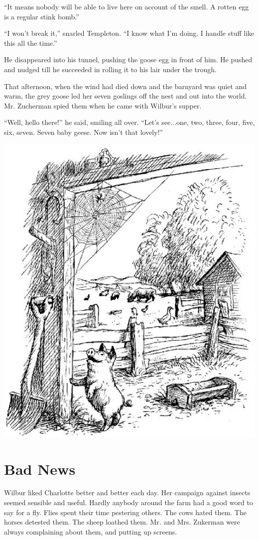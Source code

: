 \documentclass[a4paper, oneside]{book}
\begin{document}
 ``It means nobody will be able to live here on account of the smell.
A rotten egg is a regular stink bomb.''

 ``I won't break it,'' snarled Templeton. ``I know what I'm doing. I
handle stuff like this all the time.''

 He disappeared into his tunnel, pushing the goose egg in front of
him. He pushed and nudged till he succeeded in rolling it to his lair
under the trough.

 That afternoon, when the wind had died down and the barnyard
was quiet and warm, the grey goose led her seven goslings off the
nest and out into the world. Mr. Zucherman spied them when he
came with Wilbur's supper. 

 ``Well, hello there!'' he said, smiling all over. ``Let's see...one, two,
three, four, five, six, seven. Seven baby geese. Now isn't that
lovely!'' 

\vspace{0.1cm}

 \includegraphics[scale=0.5]{cover.eps}
 
  \chapter{Bad News}
 Wilbur liked Charlotte better and better each day. Her campaign
against insects seemed sensible and useful. Hardly anybody 
around the farm had a good word to say for a fly. Flies spent their
time pestering others. The cows hated them. The horses detested
them. The sheep loathed them. Mr. and Mrs. Zukerman were
always complaining about them, and putting up screens.
\end{document}

